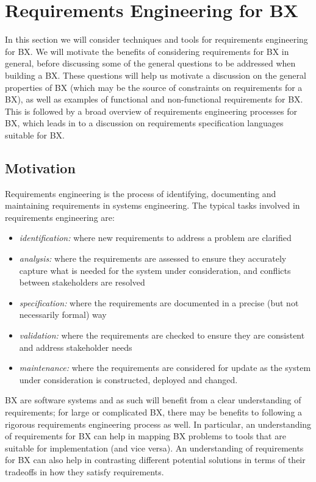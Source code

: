 \section{Requirements Engineering for BX}
\label{section:requirements}

In this section we will consider techniques and tools for requirements engineering for BX. We will motivate the benefits of considering requirements for BX in general, before discussing some of the general questions to be addressed when building a BX. These questions will help us motivate a discussion on the general properties of BX (which may be the source of constraints on requirements for a BX), as well as examples of functional and non-functional requirements for BX. This is followed by a broad overview of requirements engineering processes for BX, which leads in to a discussion on requirements specification languages suitable for BX.

\subsection{Motivation}
Requirements engineering is the process of identifying, documenting and maintaining requirements in systems engineering. The typical tasks involved in requirements engineering are:
\begin{itemize}
\item \textit{identification:} where new requirements to address a problem are clarified
\item \textit{analysis:} where the requirements are assessed to ensure they accurately capture what is needed for the system under consideration, and conflicts between stakeholders are resolved
\item \textit{specification:} where the requirements are documented in a precise (but not necessarily formal) way
\item \textit{validation:} where the requirements are checked to ensure they are consistent and address stakeholder needs
\item \textit{maintenance:} where the requirements are considered for update as the system under consideration is constructed, deployed and changed.
\end{itemize}
BX are software systems and as such will benefit from a clear understanding of requirements; for large or complicated BX, there may be benefits to following a rigorous requirements engineering process as well. In particular, an understanding of requirements for BX can help in mapping BX problems to tools that are suitable for implementation (and vice versa). An understanding of requirements for BX can also help in contrasting different potential solutions in terms of their tradeoffs in how they satisfy requirements.  

